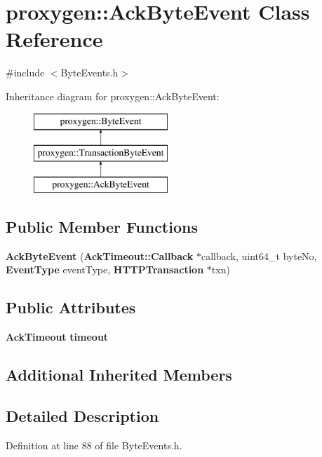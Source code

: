 \section{proxygen\+:\+:Ack\+Byte\+Event Class Reference}
\label{classproxygen_1_1AckByteEvent}


{\ttfamily \#include $<$Byte\+Events.\+h$>$}

Inheritance diagram for proxygen\+:\+:Ack\+Byte\+Event\+:\begin{figure}[H]
\begin{center}
\leavevmode
\includegraphics[height=3.000000cm]{classproxygen_1_1AckByteEvent}
\end{center}
\end{figure}
\subsection*{Public Member Functions}
\begin{DoxyCompactItemize}
\item 
{\bf Ack\+Byte\+Event} ({\bf Ack\+Timeout\+::\+Callback} $\ast$callback, uint64\+\_\+t byte\+No, {\bf Event\+Type} event\+Type, {\bf H\+T\+T\+P\+Transaction} $\ast$txn)
\end{DoxyCompactItemize}
\subsection*{Public Attributes}
\begin{DoxyCompactItemize}
\item 
{\bf Ack\+Timeout} {\bf timeout}
\end{DoxyCompactItemize}
\subsection*{Additional Inherited Members}


\subsection{Detailed Description}


Definition at line 88 of file Byte\+Events.\+h.



